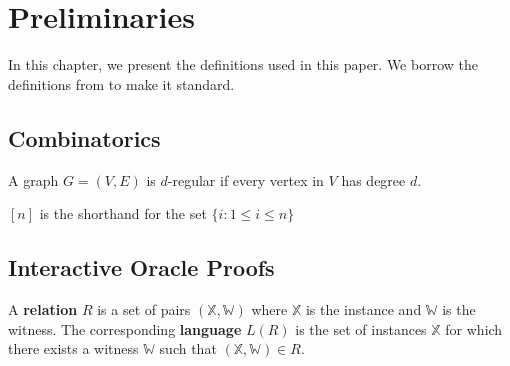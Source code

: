 \chapter{Preliminaries}

In this chapter, we present the definitions used in this paper. We borrow the definitions from \cite{brakedown} \cite{cryptoeprint:2020/1426} \cite{BCL22} \cite{10.1145/2554797.2554815} \cite{orion} \cite{lwe} \cite{DBLP:conf/tcc/Ben-SassonCS16} \cite{DBLP:journals/iacr/BonehDFG20a} to make it standard.

\section{Combinatorics}

\begin{definition}

A graph $G = (V, E)$ is $d$-regular if every vertex in $V$ has degree $d$.

\end{definition}

\begin{definition}[Set]

$[n]$ is the shorthand for the set $\{i: 1 \le i \le n\}$

\end{definition}

\section{Interactive Oracle Proofs}

\begin{definition}[Relation]

A \textbf{relation} $R$ is a set of pairs $(\mathbb{X}, \mathbb{W})$ where $\mathbb{X}$ is the instance and $\mathbb{W}$ is the witness. The corresponding \textbf{language} $L(R)$ is the set of instances $\mathbb{X}$ for which there exists a witness $\mathbb{W}$ such that $(\mathbb{X}, \mathbb{W}) \in R$.

\end{definition}

